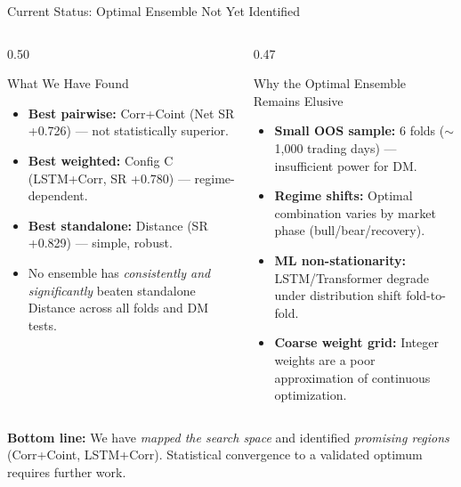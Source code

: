 \documentclass[aspectratio=169,10pt]{beamer}
\begin{document}
\begin{frame}{Current Status: Optimal Ensemble Not Yet Identified}
  \vspace{2pt}
  \begin{columns}[T]
    \begin{column}{0.50\textwidth}
      \begin{block}{What We Have Found}
        \small
        \begin{itemize}\itemsep4pt
          \item \textbf{Best pairwise:} Corr+Coint (Net SR +0.726) --- not statistically superior.
          \item \textbf{Best weighted:} Config C (LSTM+Corr, SR +0.780) --- regime-dependent.
          \item \textbf{Best standalone:} Distance (SR +0.829) --- simple, robust.
          \item No ensemble has \emph{consistently and significantly} beaten standalone Distance across all folds and DM tests.
        \end{itemize}
      \end{block}
    \end{column}
    \begin{column}{0.47\textwidth}
      \begin{block}{Why the Optimal Ensemble Remains Elusive}
        \small
        \begin{itemize}\itemsep4pt
          \item \textbf{Small OOS sample:} 6 folds ($\sim$1,000 trading days) --- insufficient power for DM.
          \item \textbf{Regime shifts:} Optimal combination varies by market phase (bull/bear/recovery).
          \item \textbf{ML non-stationarity:} LSTM/Transformer degrade under distribution shift fold-to-fold.
          \item \textbf{Coarse weight grid:} Integer weights are a poor approximation of continuous optimization.
        \end{itemize}
      \end{block}
    \end{column}
  \end{columns}
  \vspace{5pt}
  \small\textbf{Bottom line:} We have \emph{mapped the search space} and identified \emph{promising regions} (Corr+Coint, LSTM+Corr). Statistical convergence to a validated optimum requires further work.
\end{frame}
\end{document}
